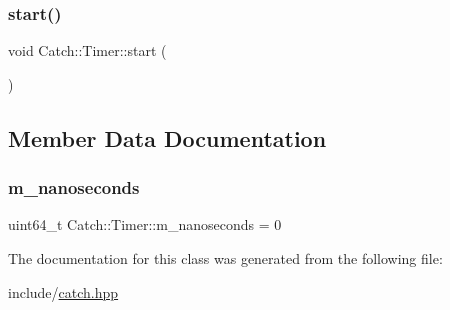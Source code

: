 \mbox{\label{class_catch_1_1_timer_a0a56e879e43f36c102bf9ea8b5fc8b72}} 
\subsubsection{\texorpdfstring{start()}{start()}}
{\footnotesize\ttfamily void Catch\+::\+Timer\+::start (\begin{DoxyParamCaption}{ }\end{DoxyParamCaption})}



\subsection{Member Data Documentation}
\mbox{\label{class_catch_1_1_timer_ac13c1ef867cc3b9f942032d5ed79c2a7}} 
\subsubsection{\texorpdfstring{m\_nanoseconds}{m\_nanoseconds}}
{\footnotesize\ttfamily uint64\+\_\+t Catch\+::\+Timer\+::m\+\_\+nanoseconds = 0\hspace{0.3cm}{\ttfamily [private]}}



The documentation for this class was generated from the following file\+:\begin{DoxyCompactItemize}
\item 
include/\mbox{\hyperlink{catch_8hpp}{catch.\+hpp}}\end{DoxyCompactItemize}
